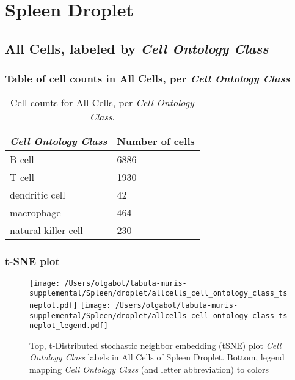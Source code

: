 \clearpage
\section{Spleen Droplet}

\subsection{All Cells, labeled by \emph{Cell Ontology Class}}
\subsubsection{Table of cell counts in All Cells, per \emph{Cell Ontology Class}}\begin{table}[h]
\centering
\label{my-label}
\begin{tabular}{@{}ll@{}}
\toprule

\emph{Cell Ontology Class}& Number of cells \\ \midrule
B cell & 6886 \\

T cell & 1930 \\

dendritic cell & 42 \\

macrophage & 464 \\

natural killer cell & 230 \\
\bottomrule
\end{tabular}
\caption{Cell counts for All Cells, per \emph{Cell Ontology Class}.}
\end{table}

\clearpage
\subsubsection{t-SNE plot}
\begin{figure}[h]
\centering
\texttt{[image: /Users/olgabot/tabula-muris-supplemental/Spleen/droplet/allcells\_cell\_ontology\_class\_tsneplot.pdf]}
\texttt{[image: /Users/olgabot/tabula-muris-supplemental/Spleen/droplet/allcells\_cell\_ontology\_class\_tsneplot\_legend.pdf]}
\caption{Top, t-Distributed stochastic neighbor embedding (tSNE) plot  \emph{Cell Ontology Class} labels in All Cells of Spleen Droplet. Bottom, legend mapping \emph{Cell Ontology Class} (and letter abbreviation) to colors}
\end{figure}


\clearpage

